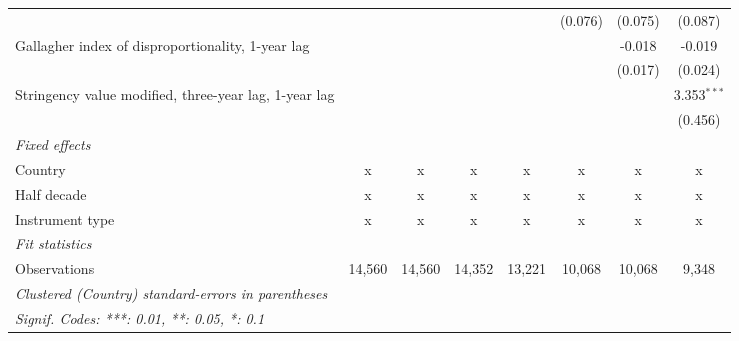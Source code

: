 \begin{table}[htbp]
\begin{tabular}{lccccccc}
                                                            &              &              &              &             & (0.076)      & (0.075)      & (0.087)\\   
      Gallagher index of disproportionality, 1-year lag     &              &              &              &             &              & -0.018       & -0.019\\   
                                                            &              &              &              &             &              & (0.017)      & (0.024)\\   
      Stringency value modified, three-year lag, 1-year lag &              &              &              &             &              &              & 3.353$^{***}$\\   
                                                            &              &              &              &             &              &              & (0.456)\\   
      \emph{Fixed effects}\\
      Country                                               & x            & x            & x            & x           & x            & x            & x\\  
      Half decade                                           & x            & x            & x            & x           & x            & x            & x\\  
      Instrument type                                       & x            & x            & x            & x           & x            & x            & x\\  
      \midrule \emph{Fit statistics}\\
      Observations                                          & 14,560       & 14,560       & 14,352       & 13,221      & 10,068       & 10,068       & 9,348\\  
      \midrule
      \multicolumn{8}{l}{\emph{Clustered (Country) standard-errors in parentheses}}\\
      \multicolumn{8}{l}{\emph{Signif. Codes: ***: 0.01, **: 0.05, *: 0.1}}\\
   \end{tabular}
\end{table}


